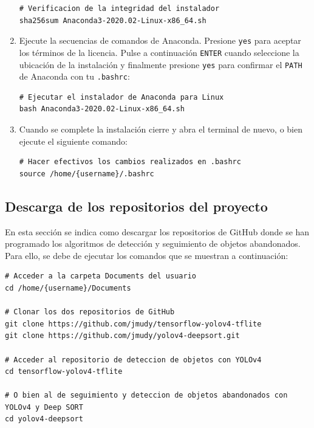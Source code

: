 \begin{enumerate}
\begin{lstlisting}[language=iPython,caption=Verificación de la integridad de la instalación de Anaconda,captionpos=b,label={lst:verificar-sha256}]
# Verificacion de la integridad del instalador
sha256sum Anaconda3-2020.02-Linux-x86_64.sh
\end{lstlisting}
    
    \item Ejecute la secuencias de comandos de Anaconda. Presione \texttt{yes} para aceptar los términos de la licencia. Pulse a continuación \texttt{ENTER} cuando seleccione la ubicación de la instalación y finalmente presione \texttt{yes} para confirmar el \texttt{PATH} de Anaconda con tu \texttt{.bashrc}:
    
    \vspace{0.5cm}
    
\begin{lstlisting}[language=iPython,caption=Ejecutar el instalador de Anaconda para Linux,captionpos=b,label={lst:install-conda}]
# Ejecutar el instalador de Anaconda para Linux
bash Anaconda3-2020.02-Linux-x86_64.sh
\end{lstlisting}
    
    \item Cuando se complete la instalación cierre y abra el terminal de nuevo, o bien ejecute el siguiente comando:
    
    \vspace{0.5cm}
    
\begin{lstlisting}[language=iPython,caption=Hacer efectivo los cambios en el fichero .bashrc,captionpos=b,label={lst:source-bashrc}]
# Hacer efectivos los cambios realizados en .bashrc
source /home/{username}/.bashrc
\end{lstlisting}
\end{enumerate}

\subsection{Descarga de los repositorios del proyecto}
\label{subsec:descargas-repos}

En esta sección se indica como descargar los repositorios de GitHub donde se han programado los algoritmos de detección y seguimiento de objetos abandonados. Para ello, se debe de ejecutar los comandos que se muestran a continuación:

\vspace{0.5cm}

\begin{lstlisting}[language=iPython,caption=Descarga repositorio,captionpos=b,label={lst:descarga-repo}]
# Acceder a la carpeta Documents del usuario
cd /home/{username}/Documents

# Clonar los dos repositorios de GitHub
git clone https://github.com/jmudy/tensorflow-yolov4-tflite
git clone https://github.com/jmudy/yolov4-deepsort.git

# Acceder al repositorio de deteccion de objetos con YOLOv4
cd tensorflow-yolov4-tflite

# O bien al de seguimiento y deteccion de objetos abandonados con YOLOv4 y Deep SORT
cd yolov4-deepsort
\end{lstlisting}


